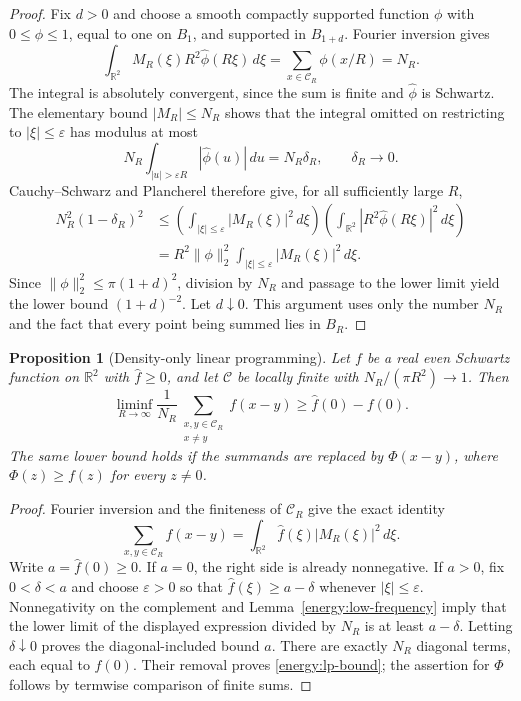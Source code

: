 \documentclass[11pt]{article}
\newtheorem{proposition}[theorem]{Proposition}
\theoremstyle{remark}\newtheorem{remark}[theorem]{Remark}
\begin{document}
\begin{proof}
Fix $d>0$ and choose a smooth compactly supported function $\phi$
with $0\le\phi\le1$, equal to one on $B_1$, and supported in
$B_{1+d}$. Fourier inversion gives
\[
 \int_{\mathbb R^2}M_R(\xi)R^2\widehat\phi(R\xi)\,d\xi
 =\sum_{x\in\mathcal C_R}\phi(x/R)=N_R.
\]
The integral is absolutely convergent, since the sum is finite and
$\widehat\phi$ is Schwartz. The elementary bound $|M_R|\le N_R$
shows that the integral omitted on restricting to $|\xi|\le\varepsilon$
has modulus at most
\[
 N_R\int_{|u|>\varepsilon R}|\widehat\phi(u)|\,du
 =N_R\delta_R,\qquad \delta_R\longrightarrow0.
\]
Cauchy--Schwarz and Plancherel therefore give, for all sufficiently
large $R$,
\begin{align*}
 N_R^2(1-\delta_R)^2
 &\le
 \left(\int_{|\xi|\le\varepsilon}|M_R(\xi)|^2\,d\xi\right)
 \left(\int_{\mathbb R^2}|R^2\widehat\phi(R\xi)|^2\,d\xi\right)\\
 &=R^2\|\phi\|_2^2
 \int_{|\xi|\le\varepsilon}|M_R(\xi)|^2\,d\xi.
\end{align*}
Since $\|\phi\|_2^2\le\pi(1+d)^2$, division by $N_R$ and passage
to the lower limit yield the lower bound $(1+d)^{-2}$.
Let $d\downarrow0$. This argument uses only the number $N_R$ and the
fact that every point being summed lies in $B_R$.
\end{proof}

\begin{proposition}[Density-only linear programming]
\label{energy:lp}
Let $f$ be a real even Schwartz function on $\mathbb R^2$ with
$\widehat f\ge0$, and let $\mathcal C$ be locally finite with
$N_R/(\pi R^2)\to1$. Then
\begin{equation}
 \liminf_{R\to\infty}\frac1{N_R}
 \sum_{\substack{x,y\in\mathcal C_R\\x\ne y}}f(x-y)
 \ge\widehat f(0)-f(0).
 \label{energy:lp-bound}
\end{equation}
The same lower bound holds if the summands are replaced by
$\Phi(x-y)$, where $\Phi(z)\ge f(z)$ for every $z\ne0$.
\end{proposition}

\begin{proof}
Fourier inversion and the finiteness of $\mathcal C_R$ give the exact identity
\[
 \sum_{x,y\in\mathcal C_R}f(x-y)
 =\int_{\mathbb R^2}\widehat f(\xi)|M_R(\xi)|^2\,d\xi.
\]
Write $a=\widehat f(0)\ge0$. If $a=0$, the right side is already
nonnegative. If $a>0$, fix $0<\delta<a$ and choose $\varepsilon>0$
so that $\widehat f(\xi)\ge a-\delta$ whenever $|\xi|\le\varepsilon$.
Nonnegativity on the complement and
Lemma~\ref{energy:low-frequency} imply that the lower limit of the
displayed expression divided by $N_R$ is at least $a-\delta$.
Letting $\delta\downarrow0$ proves the diagonal-included bound $a$.
There are exactly $N_R$ diagonal terms, each equal to $f(0)$.
Their removal proves \eqref{energy:lp-bound}; the assertion for
$\Phi$ follows by termwise comparison of finite sums.
\end{proof}
\end{document}
